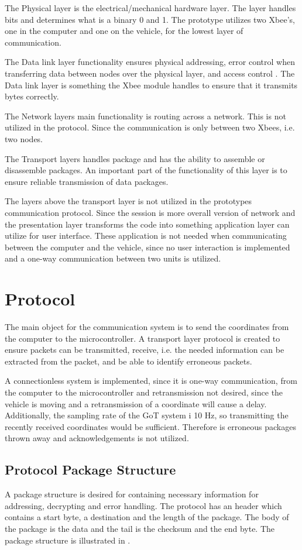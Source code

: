 The Physical layer is the electrical/mechanical hardware layer. The layer handles bits and determines what is a binary 0 and 1. The prototype utilizes two Xbee's, one in the computer and one on the vehicle, for the lowest layer of communication.

The Data link layer functionality ensures physical addressing, error control when transferring data between nodes over the physical layer, and access control \cite{J.M.Network}. The Data link layer is something the Xbee module handles to ensure that it transmits bytes correctly.

The Network layers main functionality is routing across a network. This is not utilized in the protocol. Since the communication is only between two Xbees, i.e. two nodes. 

The Transport layers handles package and has the ability to assemble or disassemble packages. An important part of the functionality of this layer is to ensure reliable transmission of data packages.

The layers above the transport layer is not utilized in the prototypes communication protocol. Since the session is more overall version of network and the presentation layer transforms the code into something application layer can utilize for user interface. These application is not needed when communicating between the computer and the vehicle, since no user interaction is implemented and a one-way communication between two units is utilized. 

\section{Protocol}
The main object for the communication system is to send the coordinates from the computer to the microcontroller. A transport layer protocol is created to ensure packets can be transmitted, receive, i.e. the needed information can be extracted from the packet, and be able to identify erroneous packets.

A connectionless system is implemented, since it is one-way communication, from the computer to the microcontroller and retransmission not desired, since the vehicle is moving and a retransmission of a coordinate will cause a delay. Additionally, the sampling rate of the GoT system i 10 \si{Hz}, so transmitting the recently received coordinates would be sufficient. Therefore is erroneous packages thrown away and acknowledgements is not utilized.

\subsection{Protocol Package Structure}
A package structure is desired for containing necessary information for addressing, decrypting and error handling. The protocol has an header which contains a start byte, a destination and the length of the package. The body of the package is the data and the tail is the checksum and the end byte. The package structure is illustrated in .

